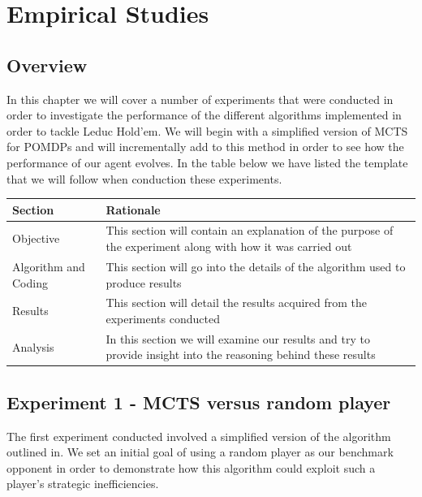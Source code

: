 
\chapter{Empirical Studies}\label{ch:empirical}

\section{Overview}\label{sec:empOverview}
In this chapter we will cover a number of experiments that were conducted in order to investigate
the performance of the different algorithms implemented in order to tackle Leduc Hold'em.
We will begin with a simplified version of MCTS for POMDPs and will incrementally add to this
method in order to see how the performance of our agent evolves.
In the table below we have listed the template that we will follow when conduction these experiments.

\begin{tabular}{ | p{2cm} | p{10cm} | }
    \hline
    \textbf{Section} & \textbf{Rationale} \\
    \hline
    Objective & This section will contain an explanation of the purpose of the experiment along with
    how it was carried out \\
    \hline
    Algorithm and Coding & This section will go into the details of the algorithm used to produce results \\
    \hline
    Results & This section will detail the results acquired from the experiments conducted \\
    \hline
    Analysis & In this section we will examine our results and try to provide insight into the
    reasoning behind these results \\
    \hline
\end{tabular}

\section{Experiment 1 - MCTS versus random player}\label{sec:expmeriment1}
The first experiment conducted involved a simplified version of the algorithm outlined in\citep{silver2010monte}.
We set an initial goal of using a random player as our benchmark opponent in order to demonstrate how
this algorithm could exploit such a player's strategic inefficiencies.

